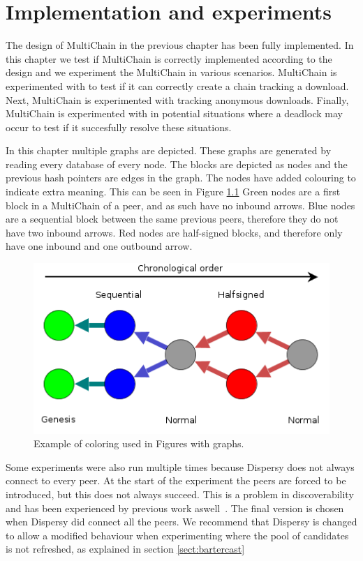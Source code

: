 \chapter{Implementation and experiments}
The design of MultiChain in the previous chapter has been fully implemented.
In this chapter we test if MultiChain is correctly implemented according to the design
and we experiment the MultiChain in various scenarios.
MultiChain is experimented with to test if it can correctly create a chain tracking a download.
Next, MultiChain is experimented with tracking anonymous downloads.
Finally, MultiChain is experimented with in potential situations where a deadlock may occur
to test if it succesfully resolve these situations.

In this chapter multiple graphs are depicted.
These graphs are generated by reading every database of every node.
The blocks are depicted as nodes and the previous hash pointers are edges in the graph.
The nodes have added colouring to indicate extra meaning.
This can be seen in Figure \ref{fig:graph-example}
Green nodes are a first block in a MultiChain of a peer,
and as such have no inbound arrows.
Blue nodes are a sequential block between the same previous peers,
therefore they do not have two inbound arrows.
Red nodes are half-signed blocks,
and therefore only have one inbound and one outbound arrow.

\begin{figure}[!h]
	\centerline{\includegraphics[scale=0.6]{experimentation/example.png}}
	\caption{Example of coloring used in Figures with graphs.}
	\label{fig:graph-example}
\end{figure}

Some experiments were also run multiple times because Dispersy does not always connect to every peer.
At the start of the experiment the peers are forced to be introduced,
but this does not always succeed.
This is a problem in discoverability and has been experienced by previous work aswell~\cite{ruigrok-anonymous}.
The final version is chosen when Dispersy did connect all the peers.
We recommend that Dispersy is changed to allow a modified behaviour when experimenting
where the pool of candidates is not refreshed,
as explained in section \ref{sect:bartercast}

